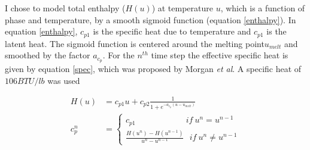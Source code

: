 \documentclass{article}
\makeatletter
\newcommand{\autocitel}[1]{\autocite{#1}\checknextarg}
\newcommand{\checknextarg}{\@ifnextchar\bgroup{\gobblenextarg}{}}
\newcommand{\gobblenextarg}[1]{$^,$\autocite{#1}\@ifnextchar\bgroup{\gobblenextarg}{}}
\makeatother
\begin{document}
	I chose to model total enthalpy ($H(u)$) at temperature $u$, which is a function of phase and temperature, by a smooth sigmoid function (equation \ref{enthalpy}). In equation \ref{enthalpy}, $c_{p1}$ is the specific heat due to temperature and $c_{p1}$ is the latent heat. The sigmoid function is centered around the melting point$u_{melt}$  and smoothed by the factor $a_{c_p}$. For the $n^{th}$ time step the effective specific heat is given by equation \ref{spec}, which was proposed by Morgan \textit{et al}\autocitel{morgan1978improved}. A specific heat of $106 BTU/lb$ was used  
	
\begin{align}
H(u) &= c_{p1} u + c_{p2} \frac{1}{1 + e^{-a_{c_p}(u - u_{melt})}} \label{enthalpy} \\
c_p^n &= \begin{cases}
c_{p1} \qquad \qquad \qquad if ~u^n = u^{n-1} \\
\frac{H(u^n) - H(u^{n-1})}{u^n - u^{n-1}}
 ~~~ if ~u^n \neq u^{n-1} \end{cases}\label{spec}
\end{align}    
\end{document}
